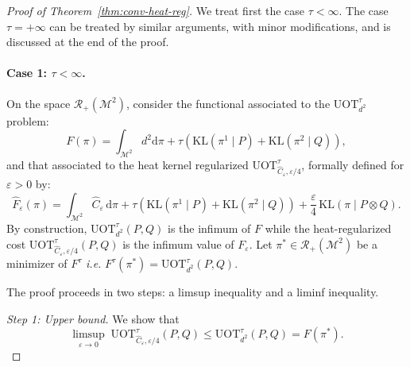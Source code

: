 \documentclass{article}
\theoremstyle{plain}
\theoremstyle{definition}
\theoremstyle{remark}
\newcommand{\M}{\ensuremath{\mathcal{M}}}
\begin{document}
\begin{proof}[Proof of Theorem~\ref{thm:conv-heat-reg}]
We treat first the case $\tau < \infty$. The case $\tau = +\infty$ can be treated by similar arguments, with minor modifications, and is discussed at the end of the proof.
\paragraph{Case 1: $\tau < \infty$.}
On the space $\mathcal{R}_{+}(\M^2)$, consider the functional associated to the $\mathrm{UOT}^{\tau}_{d^2}$ problem:
\[
F(\pi) = \int_{\M^2} d^2 \mathrm{d}\pi + \tau \left( \mathrm{KL}(\pi^1 \mid P)
+ \mathrm{KL}(\pi^2 \mid Q)\right),
\]
and that associated to the heat kernel regularized $\mathrm{UOT}^{\tau}_{\widehat C_{\varepsilon}, \varepsilon/4}$, formally defined for $\varepsilon > 0$ by:
\[
\hat{F}_{\varepsilon}(\pi) = \int_{\M^2} \widehat C_{\varepsilon}\, \mathrm{d}\pi 
+ \tau\left( \mathrm{KL}(\pi^1 \mid P)
+ \mathrm{KL}(\pi^2 \mid Q)\right) + \frac{\varepsilon}{4} \,\mathrm{KL}(\pi \mid P \otimes Q).
\]
By construction, $\mathrm{UOT}^{\tau}_{d^2}(P,Q)$ is the infimum of $F$ while the heat-regularized cost $\mathrm{UOT}^{\tau}_{\widehat C_{\varepsilon}, \varepsilon/4}(P,Q)$ is the infimum value of $F_{\varepsilon}$. Let $\pi^* \in \mathcal{R}_{+}(\M^2)$ be a minimizer of $F^{\tau}$ \emph{i.e.} $F^{\tau}(\pi^*) = \mathrm{UOT}^{\tau}_{d^2}(P,Q)$.

The proof proceeds in two steps: a limsup inequality and a liminf inequality.

\textit{Step 1: Upper bound.} 
We show that
\[
\limsup_{\varepsilon \to 0}\; \mathrm{UOT}^{\tau}_{\widehat{C}_\varepsilon, \varepsilon/4}(P,Q) 
\le \mathrm{UOT}^{\tau}_{d^2}(P,Q) = F(\pi^*).
\]


\end{proof}
\end{document}
